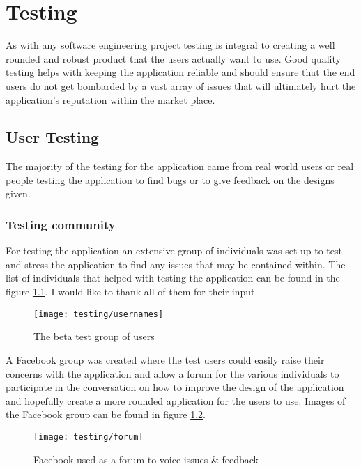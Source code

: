 \chapter{Testing}

As with any software engineering project testing is integral to creating a well rounded and robust product that the users actually want to use. Good quality testing helps with keeping the application reliable and should ensure that the end users do not get bombarded by a vast array of issues that will ultimately hurt the application's reputation within the market place.

\section{User Testing} 

The majority of the testing for the application came from real world users or real people testing the application to find bugs or to give feedback on the designs given.

\subsection{Testing community}

For testing the application an extensive group of individuals was set up to test and stress the application to find any issues that may be contained within. The list of individuals that helped with testing the application can be found in the figure \ref{fig:test_users}. I would like to thank all of them for their input.

\begin{figure}[H]
    \centering
    \texttt{[image: testing/usernames]}
    \caption{The beta test group of users}
    \label{fig:test_users}
\end{figure}

\noindent
A Facebook group was created where the test users could easily raise their concerns with the application and allow a forum for the various individuals to participate in the conversation on how to improve the design of the application and hopefully create a more rounded application for the users to use. Images of the Facebook group can be found in figure \ref{fig:facebook_group}.

\begin{figure}[H]
    \centering
    \texttt{[image: testing/forum]}
    \caption{Facebook used as a forum to voice issues \& feedback}
    \label{fig:facebook_group}
\end{figure} 

